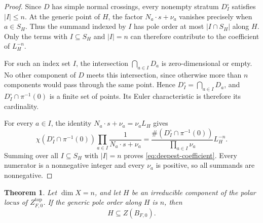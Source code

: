 \documentclass[12pt]{amsart}
\numberwithin{equation}{section}
\theoremstyle{plain}
\newtheorem{theorem}{Theorem}[section]
\theoremstyle{definition}
\theoremstyle{remark}
\theoremstyle{definition}
\begin{document}
\begin{proof}
Since $D$ has simple normal crossings, every nonempty stratum $D_I^\circ$ satisfies $|I|\leq n$. At the generic point of $H$, the factor $N_a\cdot s+\nu_a$ vanishes precisely when $a\in S_H$. Thus the summand indexed by $I$ has pole order at most $|I\cap S_H|$ along $H$. Only the terms with $I\subseteq S_H$ and $|I|=n$ can therefore contribute to the coefficient of $L_H^{-n}$.

For such an index set $I$, the intersection $\bigcap_{a\in I}D_a$ is zero-dimensional or empty. No other component of $D$ meets this intersection, since otherwise more than $n$ components would pass through the same point. Hence $D_I^\circ=\bigcap_{a\in I}D_a$, and $D_I^\circ\cap\pi^{-1}(0)$ is a finite set of points. Its Euler characteristic is therefore its cardinality.

For every $a\in I$, the identity $N_a\cdot s+\nu_a=\nu_aL_H$ gives
\[
\chi(D_I^\circ\cap\pi^{-1}(0))
\prod_{a\in I}\frac{1}{N_a\cdot s+\nu_a}
=
\frac{\#(D_I^\circ\cap\pi^{-1}(0))}{\prod_{a\in I}\nu_a}L_H^{-n}.
\]
Summing over all $I\subseteq S_H$ with $|I|=n$ proves \eqref{eq:deepest-coefficient}. Every numerator is a nonnegative integer and every $\nu_a$ is positive, so all summands are nonnegative.
\end{proof}

\begin{theorem}
\label{thm:maximal-order-hyperplanes}
Let $\dim X=n$, and let $H$ be an irreducible component of the polar locus of $Z^{\mathrm{top}}_{F,0}$. If the generic pole order along $H$ is $n$, then
\begin{equation*}
H\subseteq Z(B_{F,0}).
\end{equation*}
\end{theorem}
\end{document}

